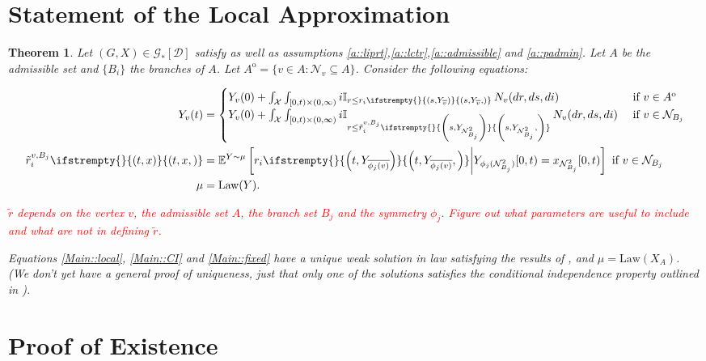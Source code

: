 \documentclass[12pt]{article}
\newcommand{\mb}{\mathbb}
\newcommand{\mc}{\mathcal}
\newcommand{\ov}{\overline}
\newcommand{\te}{\text}
\newcommand{\tr}{\textcolor{red}}
\newcommand{\ind}{\hspace{24pt}}
\newcommand{\exmu}[2]{\mb{E}^{#1}\left[#2\right]}	%
\newcommand{\cad}{\mc{D}}							%
\newcommand{\sta}{\mc{X}}							%
\newcommand{\neigh}[1]{\mc{N}_{#1}}				%
\newcommand{\dneigh}[1]{\mc{N}^2_{#1}}			%
\newcommand{\cl}[1]{\ov{#1}}						%
\newcommand{\Xf}{X}									%
\newcommand{\poiss}{N}								%
\newcommand{\rate}{r}								%
\newcommand{\xf}{x}									%
\newcommand{\poissv}[1]{_{#1}}						%
\newcommand{\vind}[1]{_{#1}}						%
\newcommand{\tme}[1]{(#1)}							%
\newcommand{\tmi}[1]{#1}							%
\newcommand{\stpara}[1]{_{#1}}						%
\newcommand{\Gs}{\mc{G}_\ast}						%
\newcommand{\tmepro}[3]{
\ifstrempty{#3}{
	\left(#1,#2\right)}{
	\left(#1,#2,#3\right)}}							%
\renewcommand{\sp}[1]{[#1]}							%
\newcommand{\Xg}{Y}									%
\newcommand{\brate}{\alt{\rate}}					%
\newcommand{\inte}[1]{{#1}^\mathrm{o}}				%
\newcommand{\alt}[1]{\tilde{#1}}					%
\newcommand{\law}{\te{Law}}							%
\newcommand{\vjpara}[2]{^{#1,#2}}					%
\newtheorem{thms}{Theorem}[section]
\begin{document}
\section{Statement of the Local Approximation}
\label{Main}


\begin{thms}
Let \((G,\Xf) \in \Gs\sp{\cad}\) satisfy \cite[assumptions \ref{F-a::bddinit},\ref{F-a::bddr}, \ref{F-a::liprx}, \ref{F-CI::indinit}]{F} as well as assumptions \ref{a::liprt},\ref{a::lctr},\ref{a::admissible} and \ref{a::padmin}. Let \(A\) be the admissible set and \(\{B_i\}\) the branches of \(A\). Let \(\inte{A} = \{v \in A: \neigh{v} \subseteq A\}\). Consider the following equations:

\begin{align}
\Xg\vind{v}\tme{t} &= 
\begin{cases}
\Xg\vind{v}\tme{0} + \int_{\sta} \int_{[0,t)\times (0,\infty)} i\mb{I}_{r\leq \rate\stpara{i}\tmepro{s}{\Xg\vind{\cl{v}}}{}}\,\poiss\poissv{v}(dr,ds,di) & \te{ if } v \in \inte{A}\\
\Xg\vind{v}\tme{0} + \int_{\sta} \int_{[0,t)\times (0,\infty)} i\mb{I}_{r\leq \brate\vjpara{v}{B_j}\stpara{i}\tmepro{s}{\Xg\vind{\dneigh{B_j}}}{}}\,\poiss\poissv{v}(dr,ds,di) &\te{ if } v \in \neigh{B_j}
\end{cases}\label{Main::local}\\
\brate\vjpara{v}{B_j}\stpara{i}\tmepro{t}{\xf}{} &= \exmu{\Xg \sim \mu}{\rate\stpara{i}\tmepro{t}{\Xg\vind{\cl{\phi_j(v)}}}{}\middle|\Xg\vind{\phi_j(\dneigh{B_j})}\tmi{[0,t)} = x\vind{\dneigh{B_j}}\tmi{[0,t)}} \te{ if } v \in \neigh{B_j}\label{Main::CI}\\
\mu &= \law(\Xg).\label{Main::fixed}
\end{align}

\tr{\(\brate\) depends on the vertex \(v\), the admissible set \(A\), the branch set \(B_j\) and the symmetry \(\phi_j\). Figure out what parameters are useful to include and what are not in defining \(\brate\).}

\ind Equations \eqref{Main::local}, \eqref{Main::CI} and \eqref{Main::fixed} have a unique weak solution in law satisfying the results of \cite[theorem \ref{F-CI::CI}]{F}, and \(\mu = \law(\Xf\vind{A})\). (We don't yet have a general proof of uniqueness, just that only one of the solutions satisfies the conditional independence property outlined in \cite[section \ref{F-CI}]{F}).
\label{Main::Main}
\end{thms}

\section{Proof of Existence}
\label{Ex}
\end{document}
